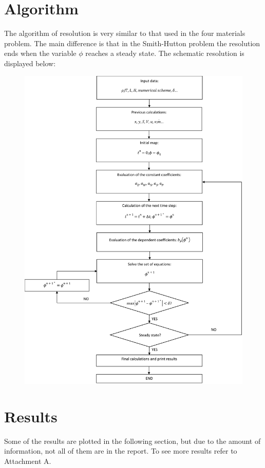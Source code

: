 \section{Algorithm}
The algorithm of resolution is very similar to that used in the four materials problem. The main difference is that in the Smith-Hutton problem the resolution ends when the variable $\phi$ reaches a steady state. The schematic resolution is displayed below:
\begin{figure}[h!]
	\includegraphics[scale=0.17]{SmithHutton/algorithm}
\end{figure}

\section{Results}
Some of the results are plotted in the following section, but due to the amount of information, not all of them are in the report. To see more results refer to Attachment A.

